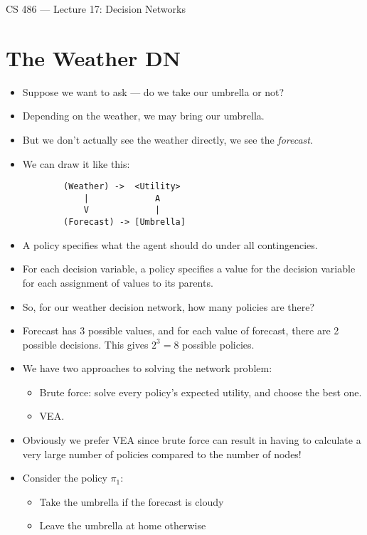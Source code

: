 \documentclass{article}
\author{Clement Tsang}
\begin{document}
\begin{center}
    \Large{CS 486 --- Lecture 17: Decision Networks}
\end{center}

\section{The Weather DN}
\begin{itemize}
    \item Suppose we want to ask --- do we take our umbrella or not?
    \item Depending on the weather, we may bring our umbrella.
    \item But we don't actually see the weather directly, we see the \emph{forecast}.
    \item We can draw it like this:
        \begin{lstlisting}
        (Weather) ->  <Utility>
            |             A
            V             |
        (Forecast) -> [Umbrella]
        \end{lstlisting}
    \item A policy specifies what the agent should do under all contingencies.
    \item For each decision variable, a policy specifies a value for the decision variable for each assignment of values to its parents.
    \item So, for our weather decision network, how many policies are there?
    \item Forecast has 3 possible values, and for each value of forecast, there are 2 possible decisions.  This gives $2^3 = 8$ possible policies.
    \item We have two approaches to solving the network problem:
        \begin{itemize}
            \item Brute force: solve every policy's expected utility, and choose the best one.
            \item VEA.
        \end{itemize}
    \item Obviously we prefer VEA since brute force can result in having to calculate a very large number of policies compared to the number of nodes!
    \item Consider the policy $\pi_1$:
        \begin{itemize}
            \item Take the umbrella if the forecast is cloudy
            \item Leave the umbrella at home otherwise

\end{itemize}
\end{itemize}
\end{document}
